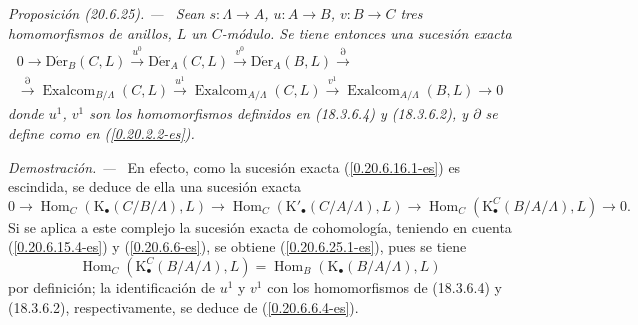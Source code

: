 \documentclass[10pt,oneside]{book}
\makeatletter
\newcommand{\sref}[1]{\textup{(\ref{#1})}}
\newcommand{\setmanualcurrentlabel}[1]{\def\@currentlabel{#1}}
\newenvironment{proposition}[1][]{%
  \setmanualcurrentlabel{#1}\par\medskip\noindent\itshape Proposición (#1). ---\ }{\par}
\newenvironment{proof}{%
  \par\medskip\noindent\textit{Demostración. ---\ }}{\par}
\makeatother
\begin{document}
\begin{proposition}[20.6.25]
\label{0.20.6.25-es}
Sean $s:\Lambda\to A$, $u:A\to B$, $v:B\to C$ tres homomorfismos
de anillos, $L$ un $C$-módulo. Se tiene entonces una sucesión exacta
\begin{equation}
\tag{20.6.25.1}
\label{0.20.6.25.1-es}
\begin{split}
  0\to\operatorname{D\acute{e}r}_B(C,L)\xrightarrow{u^0}
  \operatorname{D\acute{e}r}_A(C,L)\xrightarrow{v^0}
  \operatorname{D\acute{e}r}_A(B,L)\xrightarrow{\partial} \\
  \xrightarrow{\partial}\operatorname{Exalcom}_{B/\Lambda}(C,L)\xrightarrow{u^1}
  \operatorname{Exalcom}_{A/\Lambda}(C,L)\xrightarrow{v^1}
  \operatorname{Exalcom}_{A/\Lambda}(B,L)\to0
\end{split}
\end{equation}
donde $u^1$, $v^1$ son los homomorfismos definidos en \textup{(18.3.6.4)} y
\textup{(18.3.6.2)}, y $\partial$ se define como en \textup{\sref{0.20.2.2-es}}.
\end{proposition}

\begin{proof}
En efecto, como la sucesión exacta \sref{0.20.6.16.1-es} es escindida, se
deduce de ella una sucesión exacta
\[
  0\to\operatorname{Hom}_C(\mathrm{K}_\bullet(C/B/\Lambda),L)\to
  \operatorname{Hom}_C(\mathrm{K}'_\bullet(C/A/\Lambda),L)\to
  \operatorname{Hom}_C(\mathrm{K}^C_\bullet(B/A/\Lambda),L)\to0.
\]
Si se aplica a este complejo la sucesión exacta de cohomología, teniendo en cuenta
\sref{0.20.6.15.4-es} y \sref{0.20.6.6-es}, se obtiene
\sref{0.20.6.25.1-es}, pues se tiene
\[
  \operatorname{Hom}_C(\mathrm{K}^C_\bullet(B/A/\Lambda),L)
  =\operatorname{Hom}_B(\mathrm{K}_\bullet(B/A/\Lambda),L)
\]
por definición; la identificación de $u^1$ y $v^1$ con los homomorfismos
de (18.3.6.4) y (18.3.6.2), respectivamente, se deduce de
\sref{0.20.6.6.4-es}.
\end{proof}
\end{document}

